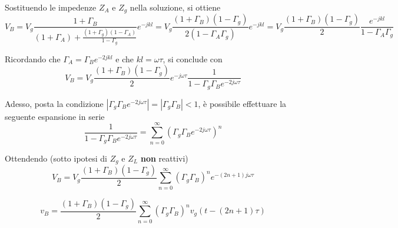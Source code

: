     Sostituendo le impedenze $Z_A$ e $Z_g$ nella soluzione, si ottiene
    \[
        V_B = V_g \frac{1 + \Gamma_B}{(1 + \Gamma_A) + \frac{(1 + \Gamma_g)(1 - \Gamma_A)}{1 - \Gamma_g}} e^{-j k l} = 
        V_g \frac{(1 + \Gamma_B) (1 - \Gamma_g)}{2(1 - \Gamma_A \Gamma_g)} e^{-j k l} =
        V_g \frac{(1 + \Gamma_B) (1 - \Gamma_g)}{2} \frac{e^{-j k l}}{1 - \Gamma_A \Gamma_g} 
    \]

    Ricordando che $\Gamma_A = \Gamma_B e^{-2 j k l}$ e che $kl = \omega \tau$, si conclude con
    \[
        V_B = V_g \frac{(1 + \Gamma_B) (1 - \Gamma_g)}{2} e^{-j \omega \tau} \frac{1}{1 - \Gamma_g \Gamma_B e^{-2 j \omega \tau}} 
    \]

    Adesso, posta la condizione $|\Gamma_g \Gamma_B e^{-2 j \omega \tau}| = |\Gamma_g \Gamma_B| < 1$, è possibile effettuare la seguente espansione in serie
    \[
        \frac{1}{1 - \Gamma_g \Gamma_B e^{-2 j \omega \tau}} = \sum_{n = 0}^{\infty} (\Gamma_g \Gamma_B e^{-2 j \omega \tau})^n
    \]

    Ottendendo (sotto ipotesi di $Z_g$ e $Z_L$ \textbf{non} reattivi)
    \[
        V_B = V_g \frac{(1 + \Gamma_B) (1 - \Gamma_g)}{2} \sum_{n = 0}^{\infty} (\Gamma_g \Gamma_B)^n e^{-(2 n + 1) j \omega \tau}
    \]
    \begin{center}
    \end{center}
    \[
        v_B = \frac{(1 + \Gamma_B) (1 - \Gamma_g)}{2} \sum_{n = 0}^{\infty} (\Gamma_g \Gamma_B)^n v_g(t - (2n + 1) \tau)
    \]
